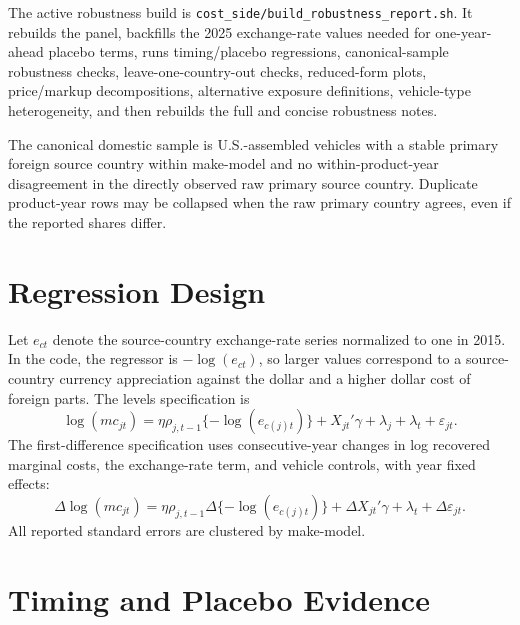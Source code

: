 \documentclass[11pt]{article}
\newcommand{\CurrentTableNote}{}
\newcommand{\settablefootnote}[1]{\renewcommand{\CurrentTableNote}{#1}}
\begin{document}
The active robustness build is \texttt{cost\_side/build\_robustness\_report.sh}. It rebuilds the panel, backfills the 2025 exchange-rate values needed for one-year-ahead placebo terms, runs timing/placebo regressions, canonical-sample robustness checks, leave-one-country-out checks, reduced-form plots, price/markup decompositions, alternative exposure definitions, vehicle-type heterogeneity, and then rebuilds the full and concise robustness notes.

\settablefootnote{Panel rows are product-year observations after matching sourcing data to recovered costs, vehicle characteristics, and exchange rates. Regression rows are smaller because the baseline specifications require lagged exposure, controls, and, for first differences, consecutive-year observations.}

\settablefootnote{}

The canonical domestic sample is U.S.-assembled vehicles with a stable primary foreign source country within make-model and no within-product-year disagreement in the directly observed raw primary source country. Duplicate product-year rows may be collapsed when the raw primary country agrees, even if the reported shares differ.

\section{Regression Design}

Let \(e_{ct}\) denote the source-country exchange-rate series normalized to one in 2015. In the code, the regressor is \(-\log(e_{ct})\), so larger values correspond to a source-country currency appreciation against the dollar and a higher dollar cost of foreign parts. The levels specification is
\begin{equation}
\log(mc_{jt}) =
\eta \rho_{j,t-1}\{-\log(e_{c(j)t})\}
+ X_{jt}'\gamma + \lambda_j + \lambda_t + \varepsilon_{jt}.
\end{equation}
The first-difference specification uses consecutive-year changes in log recovered marginal costs, the exchange-rate term, and vehicle controls, with year fixed effects:
\begin{equation}
\Delta \log(mc_{jt}) =
\eta \rho_{j,t-1}\Delta\{-\log(e_{c(j)t})\}
+ \Delta X_{jt}'\gamma + \lambda_t + \Delta\varepsilon_{jt}.
\end{equation}
All reported standard errors are clustered by make-model.

\section{Timing and Placebo Evidence}
\end{document}
